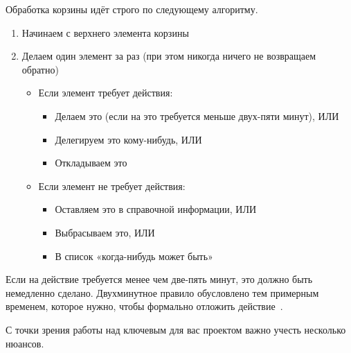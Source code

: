 \documentclass{../industrial-development}
\begin{document}
Обработка корзины идёт строго по следующему алгоритму.
\begin{enumerate}
\item Начинаем с верхнего элемента корзины
\item Делаем один элемент за раз (при этом никогда ничего не возвращаем обратно)
  \begin{itemize}
  \item Если элемент требует действия:
    \begin{itemize}
    \item Делаем это (если на это требуется меньше двух-пяти минут), ИЛИ
    \item Делегируем это кому-нибудь, ИЛИ
    \item Откладываем это
    \end{itemize}
  \item Если элемент не требует действия:
    \begin{itemize}
    \item Оставляем это в справочной информации, ИЛИ
    \item Выбрасываем это, ИЛИ
    \item В список «когда-нибудь может быть»
    \end{itemize}
  \end{itemize}
\end{enumerate}
Если на действие требуется менее чем две-пять минут, это должно быть немедленно сделано. Двухминутное правило обусловлено тем примерным временем, которое нужно, чтобы формально отложить действие~\cite{GTDWikipedia}.


\lecturenotes

С точки зрения работы над ключевым для вас проектом важно учесть несколько нюансов.
\end{document}
